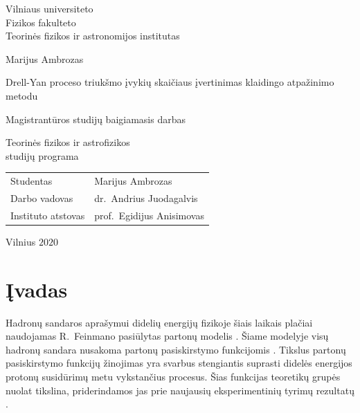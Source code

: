 \documentclass[a4paper, 12pt, oneside]{article}
\begin{document}

\begin{titlepage}
\centering
{\large Vilniaus universiteto \\ Fizikos fakulteto \\ Teorinės fizikos ir astronomijos institutas \par}
\vspace{3.5cm}
{\Large Marijus Ambrozas \par}
\vspace{0.3cm}
{\Large Drell-Yan proceso triukšmo įvykių skaičiaus įvertinimas klaidingo atpažinimo metodu\par}
\vspace{0.8cm}
{\large Magistrantūros studijų baigiamasis darbas \par}
\vspace{0.8cm}
{\large Teorinės fizikos ir astrofizikos \\ studijų programa \par}
\vspace{3.5cm}
{\large \begin{tabular*}{0.9\textwidth}{@{\extracolsep{\fill}}ll}
Studentas & Marijus Ambrozas\tabularnewline[0.5cm]
Darbo vadovas & dr.\ Andrius Juodagalvis\tabularnewline[0.5cm]
Instituto atstovas & prof.\ Egidijus Anisimovas\tabularnewline[0.5cm]
\end{tabular*} \par}
\vspace{4cm}
{\large Vilnius $2020$\par}
\end{titlepage}


\clearpage
\addtocounter{page}{1}
\tableofcontents
\clearpage

\section*{Įvadas} 
Hadronų sandaros aprašymui didelių energijų fizikoje šiais laikais plačiai naudojamas R.\ Feinmano pasiūlytas
partonų modelis \cite{FeynPartons}.
Šiame modelyje visų hadronų sandara nusakoma partonų pasiskirstymo funkcijomis \cite{BjorkPartons}.
Tikslus partonų pasiskirstymo funkcijų žinojimas yra svarbus stengiantis suprasti didelės energijos protonų susidūrimų
metu vykstančius procesus.
Šias funkcijas teoretikų grupės nuolat tikslina, priderindamos jas prie naujausių eksperimentinių tyrimų rezultatų
\cite{PDF_MMHT2015, PDF_CJ15, NNPDF, PDF_ABMP16, PDF_MMHT2019, CTEQ2019}.
\end{document}
